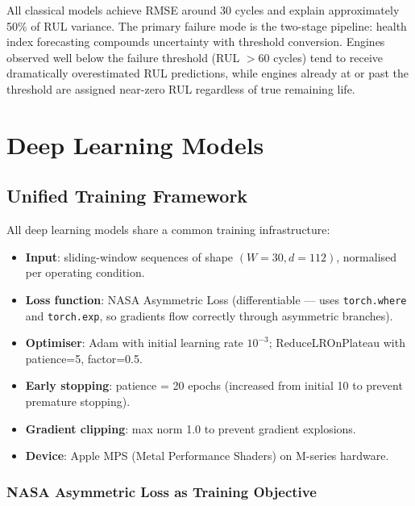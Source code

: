 \documentclass[12pt,a4paper]{report}
\begin{document}
All classical models achieve RMSE around 30 cycles and explain approximately 50\% of RUL variance. The primary failure mode is the two-stage pipeline: health index forecasting compounds uncertainty with threshold conversion. Engines observed well below the failure threshold (RUL $> 60$ cycles) tend to receive dramatically overestimated RUL predictions, while engines already at or past the threshold are assigned near-zero RUL regardless of true remaining life.

\chapter{Deep Learning Models}
\label{chap:dl}

\section{Unified Training Framework}

All deep learning models share a common training infrastructure:

\begin{itemize}[leftmargin=1.5cm]
  \item \textbf{Input}: sliding-window sequences of shape $(W=30, d=112)$, normalised per operating condition.
  \item \textbf{Loss function}: NASA Asymmetric Loss (differentiable — uses \texttt{torch.where} and \texttt{torch.exp}, so gradients flow correctly through asymmetric branches).
  \item \textbf{Optimiser}: Adam with initial learning rate $10^{-3}$; ReduceLROnPlateau with patience=5, factor=0.5.
  \item \textbf{Early stopping}: patience = 20 epochs (increased from initial 10 to prevent premature stopping).
  \item \textbf{Gradient clipping}: max norm 1.0 to prevent gradient explosions.
  \item \textbf{Device}: Apple MPS (Metal Performance Shaders) on M-series hardware.
\end{itemize}

\subsection{NASA Asymmetric Loss as Training Objective}
\end{document}
